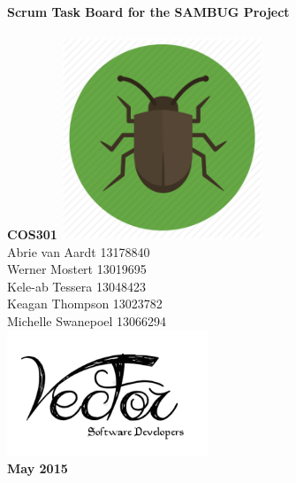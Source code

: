 \documentclass[11pt,a4paper,titlepage]{article}
\begin{document}

\begin{titlepage}
    \centering
    \vfill
    {\bfseries\Huge
         Scrum Task Board for the SAMBUG Project\\
      \hfill\\
         \Large COS301
        \vskip2cm
        \includegraphics[width=6cm]{sambug} \\

    }    
    \vfill
        Abrie van Aardt 13178840\\
		Werner Mostert 13019695\\
		Kele-ab Tessera 13048423\\
		Keagan Thompson 13023782\\
		Michelle Swanepoel 13066294\\
    
    
    \vfill
    \includegraphics[width=6cm]{logo} \\
    \textbf{May 2015}
    \vfill
\end{titlepage}
	
    
\end{document}
